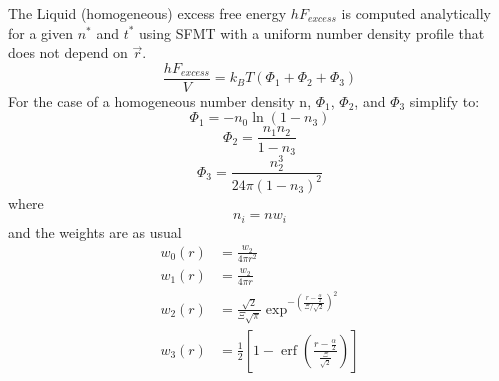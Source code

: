 \documentclass[double,12pt]{beavtex}
\begin{document}
The Liquid (homogeneous) excess free energy $hF_{excess}$ is computed analytically for a given $n^*$ and $t^*$ using SFMT with a uniform number density profile that does not depend on $\vec r$. 
\begin{displaymath}{\frac{hF_{excess}}{V} = k_BT(\Phi_1+\Phi_2+\Phi_3)}\end{displaymath} 
For the case of a homogeneous number density n, $\Phi_1$, $\Phi_2$, and $\Phi_3$ simplify to:
\begin{displaymath}{\Phi_1= -n_0\ln(1-n_3)}\end{displaymath} 
\begin{displaymath}{\Phi_2= \frac{n_1n_2}{1-n_3}}\end{displaymath} 
\color{red}\begin{displaymath}{\Phi_3=\frac{n_2^3}{24\pi(1-n_3)^2}}\end{displaymath}\color{black}
where \begin{displaymath}{n_i=nw_i}\end{displaymath} 
and the weights are as usual 
\begin{align}
  w_{0}(r) &=\frac{w_{2}}{4\pi{r}^2} \\
  w_{1}(r) &=\frac{w_{2}}{4\pi{r}} \\
  w_2(r)&=\frac{\sqrt{2}}{\Xi\sqrt\pi}\exp^{-\left(\frac{r-\frac{\alpha}{2}}{\Xi/\sqrt{2}}\right)^2}
  \\
  w_3(r)&=\frac{1}{2}\left[1-\operatorname{erf}\left(\frac{r-\frac{\alpha}{2}}{\frac{\Xi}{\sqrt{2}}}\right)\right]
\end{align}
\end{document}
